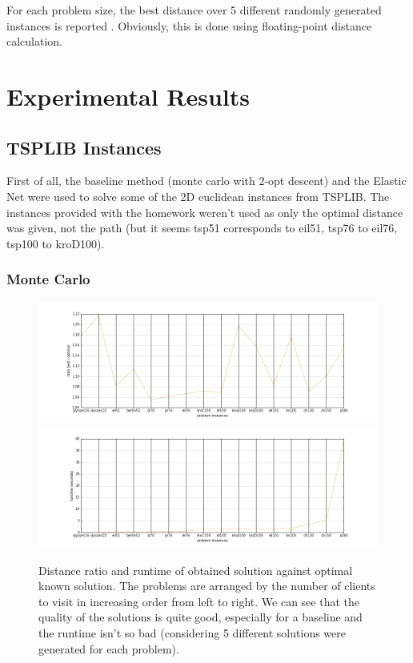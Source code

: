 \documentclass{article} %
\begin{document}
For each problem size, the best distance over 5 different randomly generated instances is reported \citep{en_original}. Obviously, this is done using floating-point distance calculation.




\newpage
\section{Experimental Results}
\label{results}


\subsection{TSPLIB Instances}
First of all, the baseline method (monte carlo with 2-opt descent) and the Elastic Net were used to solve some of the 2D euclidean instances from TSPLIB. The instances provided with the homework weren't used as only the optimal distance was given, not the path (but it seems tsp51 corresponds to eil51, tsp76 to eil76, tsp100 to kroD100).



\subsubsection{Monte Carlo}

\begin{figure}[!htb]
	\includegraphics[scale=0.4]{figs/ratios_mc}
	\includegraphics[scale=0.4]{figs/runtimes_mc}
	\caption{\small Distance ratio and runtime of obtained solution against optimal known solution. The problems are arranged by the number of clients to visit in increasing order from left to right. We can see that the quality of the solutions is quite good, especially for a baseline and the runtime isn't so bad (considering 5 different solutions were generated for each problem).}
	\label{baseline_results}
\end{figure}
\end{document}

